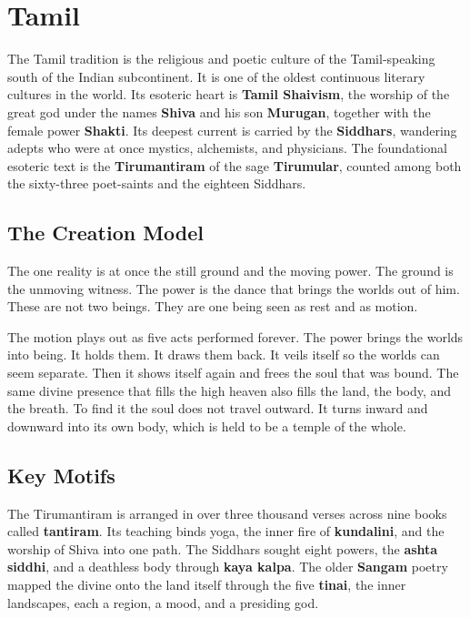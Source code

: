 \section{Tamil}

The Tamil tradition is the religious and poetic culture of the Tamil-speaking south of the Indian subcontinent. It is one of the oldest continuous literary cultures in the world. Its esoteric heart is \textbf{Tamil Shaivism}, the worship of the great god under the names \textbf{Shiva} and his son \textbf{Murugan}, together with the female power \textbf{Shakti}. Its deepest current is carried by the \textbf{Siddhars}, wandering adepts who were at once mystics, alchemists, and physicians. The foundational esoteric text is the \textbf{Tirumantiram} of the sage \textbf{Tirumular}, counted among both the sixty-three poet-saints and the eighteen Siddhars.

\subsection{The Creation Model}

The one reality is at once the still ground and the moving power. The ground is the unmoving witness. The power is the dance that brings the worlds out of him. These are not two beings. They are one being seen as rest and as motion.

The motion plays out as five acts performed forever. The power brings the worlds into being. It holds them. It draws them back. It veils itself so the worlds can seem separate. Then it shows itself again and frees the soul that was bound. The same divine presence that fills the high heaven also fills the land, the body, and the breath. To find it the soul does not travel outward. It turns inward and downward into its own body, which is held to be a temple of the whole.

\subsection{Key Motifs}

The Tirumantiram is arranged in over three thousand verses across nine books called \textbf{tantiram}. Its teaching binds yoga, the inner fire of \textbf{kundalini}, and the worship of Shiva into one path. The Siddhars sought eight powers, the \textbf{ashta siddhi}, and a deathless body through \textbf{kaya kalpa}. The older \textbf{Sangam} poetry mapped the divine onto the land itself through the five \textbf{tinai}, the inner landscapes, each a region, a mood, and a presiding god.

